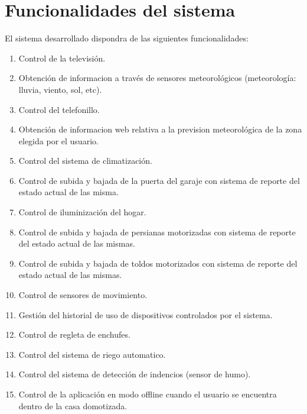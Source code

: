 \chapter{Funcionalidades del sistema}

El sistema desarrollado dispondra de las siguientes funcionalidades:
\begin{enumerate}

    \item Control de la televisión.

    \item Obtención de informacion a través de sensores meteorológicos (meteorología: lluvia, viento, sol, etc).

    \item Control del telefonillo.

    \item Obtención de informacion web relativa a la prevision meteorológica de la zona elegida por el usuario.

    \item Control del sistema de climatización.

    \item Control de subida y bajada de la puerta del garaje con sistema de reporte del estado actual de las misma.

    \item Control de iluminización del hogar.

    \item Control de subida y bajada de persianas motorizadas con sistema de reporte del estado actual de las mismas.

    \item Control de subida y bajada de toldos motorizados con sistema de reporte del estado actual de las mismas.

    \item Control de sensores de movimiento.

    \item Gestión del historial de uso de dispositivos controlados por el sistema.

    \item Control de regleta de enchufes.

    \item Control del sistema de riego automatico.

    \item Control del sistema de detección de indencios (sensor de humo).

    \item Control de la aplicación en modo offline cuando el usuario se encuentra dentro de la casa domotizada.


\end{enumerate}
